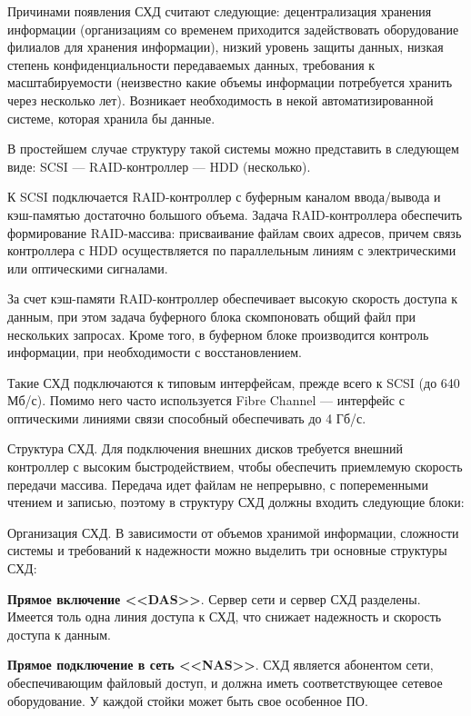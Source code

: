 \documentclass[unicode, 12pt, a4paper, oneside]{article}
\begin{document}
Причинами появления СХД считают следующие: децентрализация хранения информации (организациям со временем приходится задействовать оборудование филиалов для хранения информации), низкий уровень защиты данных, низкая степень конфиденциальности передаваемых данных, требования к масштабируемости (неизвестно какие объемы информации потребуется хранить через несколько лет). Возникает необходимость в некой автоматизированной системе, которая хранила бы данные.

В простейшем случае структуру такой системы можно представить в следующем виде: SCSI --- RAID-контроллер --- HDD (несколько).

К SCSI подключается RAID-контроллер с буферным каналом ввода/вывода и кэш-памятью достаточно большого объема. Задача RAID-контроллера обеспечить формирование RAID-массива: присваивание файлам своих адресов, причем связь контроллера с HDD осуществляется по параллельным линиям с электрическими или оптическими сигналами.

За счет кэш-памяти RAID-контроллер обеспечивает высокую скорость доступа к данным, при этом задача буферного блока скомпоновать общий файл при нескольких запросах. Кроме того, в буферном блоке производится контроль информации, при необходимости с восстановлением.

Такие СХД подключаются к типовым интерфейсам, прежде всего к SCSI (до 640 Мб/с). Помимо него часто используется Fibre Channel --- интерфейс с оптическими линиями связи способный обеспечивать до 4 Гб/с.

Структура СХД. Для подключения внешних дисков требуется внешний контроллер с высоким быстродействием, чтобы обеспечить приемлемую скорость передачи массива. Передача идет файлам не непрерывно, с попеременными чтением и записью, поэтому в структуру СХД должны входить следующие блоки:


Организация СХД. В зависимости от объемов хранимой информации, сложности системы и требований к надежности можно выделить три основные структуры СХД:

\textbf{Прямое включение <<DAS>>}. Сервер сети и сервер СХД разделены. Имеется толь одна линия доступа к СХД, что снижает надежность и скорость доступа к данным.


\textbf{Прямое подключение в сеть <<NAS>>}. СХД является абонентом сети, обеспечивающим файловый доступ, и должна иметь соответствующее сетевое оборудование. У каждой стойки может быть свое особенное ПО.
\end{document}
